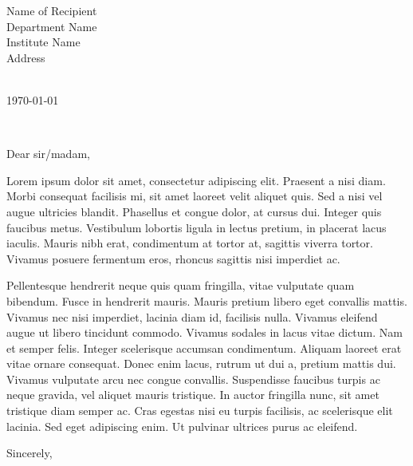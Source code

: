 \documentclass[11pt,a4paper]{letter} %
\def\opening#1{\thispagestyle{empty}
{\centering\fromaddress \vspace{0.6in} \\ %
\hspace*{0.8\longindentation}\today\hspace*{\fill}\par} %
{\raggedright \toname \\ \toaddress \par} %
\vspace{0.4in} %
\noindent #1 %
}
\begin{document}

\begin{letter}
{
Name of Recipient\\
Department Name\\
Institute Name\\
Address
}


\opening{Dear sir/madam,}

Lorem ipsum dolor sit amet, consectetur adipiscing elit. Praesent a nisi diam. Morbi consequat facilisis mi, sit amet laoreet velit aliquet quis. Sed a nisi vel augue ultricies blandit. Phasellus et congue dolor, at cursus dui. Integer quis faucibus metus. Vestibulum lobortis ligula in lectus pretium, in placerat lacus iaculis. Mauris nibh erat, condimentum at tortor at, sagittis viverra tortor. Vivamus posuere fermentum eros, rhoncus sagittis nisi imperdiet ac.

Pellentesque hendrerit neque quis quam fringilla, vitae vulputate quam bibendum. Fusce in hendrerit mauris. Mauris pretium libero eget convallis mattis. Vivamus nec nisi imperdiet, lacinia diam id, facilisis nulla. Vivamus eleifend augue ut libero tincidunt commodo. Vivamus sodales in lacus vitae dictum. Nam et semper felis. Integer scelerisque accumsan condimentum. Aliquam laoreet erat vitae ornare consequat. Donec enim lacus, rutrum ut dui a, pretium mattis dui. Vivamus vulputate arcu nec congue convallis. Suspendisse faucibus turpis ac neque gravida, vel aliquet mauris tristique. In auctor fringilla nunc, sit amet tristique diam semper ac. Cras egestas nisi eu turpis facilisis, ac scelerisque elit lacinia. Sed eget adipiscing enim. Ut pulvinar ultrices purus ac eleifend.


\closing{Sincerely,}





\end{letter}
\end{document}
